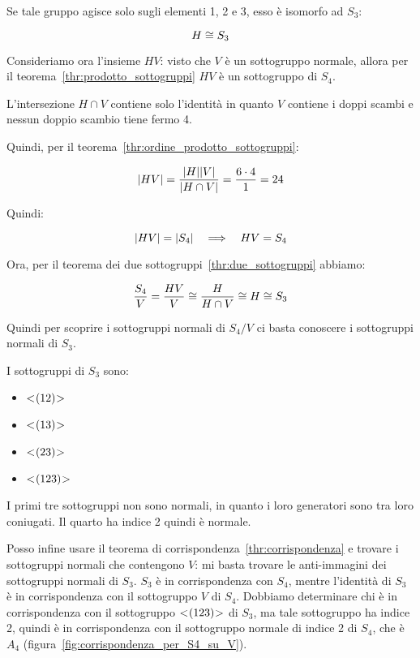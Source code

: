 \begin{soluzione}
	Se tale gruppo agisce solo sugli elementi 1, 2 e 3, esso è isomorfo ad $S_3$:
	
	\begin{equation}
		H \cong S_3
	\end{equation}

	Consideriamo ora l'insieme $HV$: visto che $V$ è un sottogruppo normale, allora per il teorema~\ref{thr:prodotto_sottogruppi} $HV$ è un sottogruppo di $S_4$.
	
	L'intersezione $H \cap V$ contiene solo l'identità in quanto $V$ contiene i doppi scambi e nessun doppio scambio tiene fermo 4.
	
	Quindi, per il teorema~\ref{thr:ordine_prodotto_sottogruppi}:
	
	\begin{equation}
		\lvert HV \rvert = \dfrac{\lvert H \rvert\lvert V \rvert}{\lvert H \cap V \rvert} = \dfrac{6 \cdot 4}{1} = 24
	\end{equation}

	Quindi:
	
	\begin{equation}
		\lvert HV \rvert = \lvert S_4 \rvert \quad\Longrightarrow\quad HV = S_4
	\end{equation}

	Ora, per il teorema dei due sottogruppi~\ref{thr:due_sottogruppi} abbiamo:
	
	\begin{equation}
		\dfrac{S_4}{V} = \dfrac{HV}{V} \cong \dfrac{H}{H \cap V} \cong H \cong S_3
	\end{equation}

	Quindi per scoprire i sottogruppi normali di $S_4/V$ ci basta conoscere i sottogruppi normali di $S_3$.
	
	I sottogruppi di $S_3$ sono:
	
	\begin{itemize}
		\item $< \negmedspace (12) \negmedspace >$
		\item $< \negmedspace (13) \negmedspace >$
		\item $< \negmedspace (23) \negmedspace >$
		\item $< \negmedspace (123) \negmedspace >$
	\end{itemize}

	I primi tre sottogruppi non sono normali, in quanto i loro generatori sono tra loro coniugati. Il quarto ha indice 2 quindi è normale.
	
	Posso infine usare il teorema di corrispondenza~\ref{thr:corrispondenza} e trovare i sottogruppi normali che contengono $V$: mi basta trovare le anti-immagini dei sottogruppi normali di $S_3$. $S_3$ è in corrispondenza con $S_4$, mentre l'identità di $S_3$ è in corrispondenza con il sottogruppo $V$ di $S_4$. Dobbiamo determinare chi è in corrispondenza con il sottogruppo $< \negmedspace (123) \negmedspace >$ di $S_3$, ma tale sottogruppo ha indice 2, quindi è in corrispondenza con il sottogruppo normale di indice 2 di $S_4$, che è $A_4$ (figura~\ref{fig:corrispondenza_per_S4_su_V}).
	

\end{soluzione}
